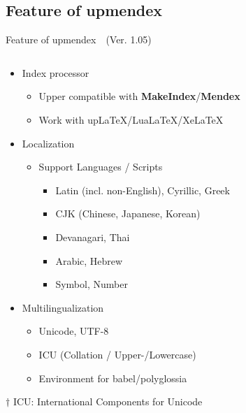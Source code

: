 \documentclass[aspectratio=169,10pt]{beamer}
\begin{document}
\subsection{Feature of upmendex}
\begin{frame}{Feature of upmendex~~{\scriptsize (Ver. 1.05)}}
\renewcommand{\thefootnote}{$\dagger$}
\begin{columns}
\begin{column}{120mm}
\begin{center}
  \begin{itemize}
  \item Index processor
    \begin{itemize}
    \item Upper compatible with \textbf{MakeIndex}/\textbf{Mendex}
    \item Work with upLaTeX/LuaLaTeX/XeLaTeX
    \end{itemize}
  \item Localization
    \begin{itemize}
    \item Support Languages / Scripts
      \begin{itemize}
      \item Latin (incl. non-English), Cyrillic, Greek
      \item CJK (Chinese, Japanese, Korean)
      \item Devanagari, Thai
      \item Arabic, Hebrew
      \item Symbol, Number
      \end{itemize}
    \end{itemize}
  \item Multilingualization
    \begin{itemize}
    \item Unicode, UTF-8
    \item ICU\footnotemark{} (Collation / Upper-/Lowercase)
    \item Environment for babel/polyglossia
    \end{itemize}
  \end{itemize}
\end{center}
\vspace{2mm}
{\footnotesize $\dagger$ ICU: International Components for Unicode}
\end{column}
\end{columns}
\end{frame}
\end{document}
